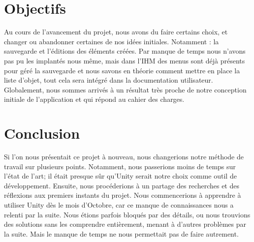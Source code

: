\documentclass[a4paper,11pt]{article}
\begin{document}
	
	
	\section{Objectifs}

		Au cours de l'avancement du projet, nous avons du faire certains choix, et changer ou abandonner certaines de nos idées initiales. Notamment : la sauvegarde et l'éditions des éléments créées.
		Par manque de temps nous n'avons pas pu les implantés nous même, mais dans l'IHM des menus sont déjà présents pour géré la sauvegarde et nous savons en théorie comment mettre en place la liste d'objet, tout cela sera intégré dans la documentation utilisateur.
		Globalement, nous sommes arrivés à un résultat très proche de notre conception initiale de l'application et qui répond au cahier des charges.
	
	\section{Conclusion}
			
			Si l'on nous présentait ce projet à nouveau, nous changerions notre méthode de travail sur plusieurs points. Notamment, nous passerions moins de temps sur l'état de l'art; il était presque sûr qu'Unity serait notre choix comme outil de développement. Ensuite, nous procéderions à un partage des recherches et des réflexions aux premiers instants du projet. Nous commencerions à apprendre à utiliser Unity dès le mois d'Octobre, car ce manque de connaissances nous a relenti par la suite. Nous étions parfois bloqués par des détails, ou nous trouvions des solutions sans les comprendre entièrement, menant à d'autres problèmes par la suite. Mais le manque de temps ne nous permettait pas de faire autrement.
			
\end{document}
